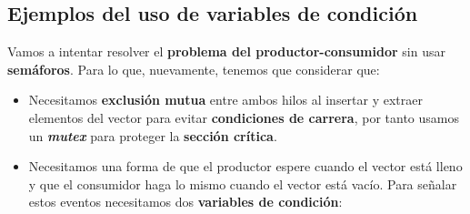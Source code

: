 \subsection{Ejemplos del uso de variables de
condición}\label{_ejemplos_del_uso_de_variables_de_condiciuxf3n}

Vamos a intentar resolver el \textbf{problema del productor-consumidor}
sin usar \textbf{semáforos}. Para lo que, nuevamente, tenemos que
considerar que:

\begin{itemize}
\item
  Necesitamos \textbf{exclusión mutua} entre ambos hilos al insertar y
  extraer elementos del vector para evitar \textbf{condiciones de
  carrera}, por tanto usamos un \textbf{\emph{mutex}} para proteger la
  \textbf{sección crítica}.
\item
  Necesitamos una forma de que el productor espere cuando el vector está
  lleno y que el consumidor haga lo mismo cuando el vector está vacío.
  Para señalar estos eventos necesitamos dos \textbf{variables de
  condición}:
\end{itemize}


